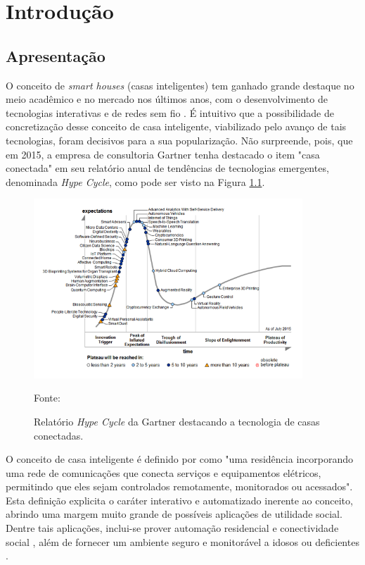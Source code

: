 \chapter{Introdução}\label{chp:intro}

\section{Apresentação}\label{sec:presentation}
O conceito de \textit{smart houses} (casas inteligentes) tem ganhado grande destaque no meio acadêmico e no mercado nos últimos anos, com o desenvolvimento de tecnologias interativas e de redes sem fio \cite{harper2006}. É intuitivo que a possibilidade de concretização desse conceito de casa inteligente, viabilizado pelo avanço de tais tecnologias, foram decisivos  para a sua popularização. Não surpreende, pois, que em 2015, a empresa de consultoria Gartner tenha destacado o item "casa conectada" em seu relatório anual de tendências de tecnologias emergentes, denominada \textit{Hype Cycle}, como pode ser visto na Figura \ref{fig:gartner}.

\begin{figure}[h]
	\centering
	\caption{Relatório \textit{Hype Cycle} da Gartner destacando a tecnologia de casas conectadas.}
  \includegraphics[width=0.9\textwidth]{imagens/gartner.png}
  \label{fig:gartner}
  
  Fonte: \cite{gartner}
\end{figure}

O conceito de casa inteligente é definido por \cite{jiang2004} como "uma residência incorporando uma rede de comunicações que conecta serviços e equipamentos elétricos, permitindo que eles sejam controlados remotamente, monitorados ou acessados". Esta definição explicita o caráter interativo e automatizado inerente ao conceito, abrindo uma margem muito grande de possíveis aplicações de utilidade social. Dentre tais aplicações, inclui-se prover automação residencial e conectividade social \cite{harper2006}, além de fornecer um ambiente seguro e monitorável a idosos ou deficientes \cite{chan2008}.



